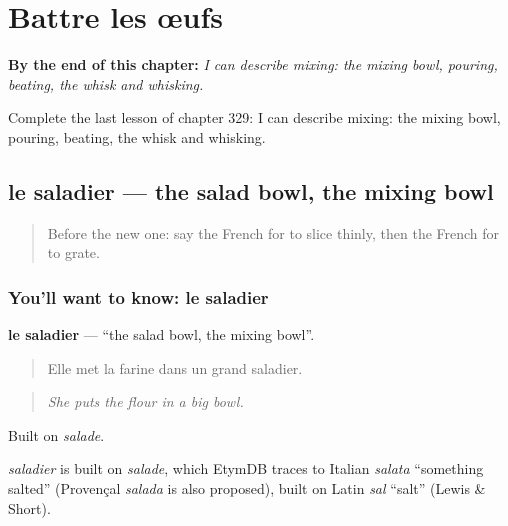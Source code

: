
\chapter{Battre les œufs}
\label{ch:fr-battre-les-ufs}

\begin{chapteropening}
\textbf{By the end of this chapter:} \emph{I can describe mixing: the mixing bowl, pouring, beating, the whisk and whisking.}

Complete the last lesson of chapter 329: I can describe mixing: the mixing bowl, pouring, beating, the whisk and whisking.
\end{chapteropening}

\section[le saladier]{le saladier — the salad bowl, the mixing bowl}

\label{lesson:FR-C329-saladier}



\begin{quote}
Before the new one: say the French for to slice thinly, then the French for to grate.
\end{quote}

\subsection*{You'll want to know: le saladier}
\textbf{le saladier} — \textquotedblleft{}the salad bowl, the mixing bowl\textquotedblright{}.

\begin{quote}
Elle met la farine dans un grand saladier.
\end{quote}

\begin{quote}
\emph{She puts the flour in a big bowl.}
\end{quote}

Built on \emph{salade}.

\begin{cousinweb}
\emph{saladier} is built on \emph{salade}, which EtymDB traces to Italian \emph{salata} \textquotedblleft{}something salted\textquotedblright{} (Provençal \emph{salada} is also proposed), built on Latin \emph{sal} \textquotedblleft{}salt\textquotedblright{} (Lewis \& Short).
\end{cousinweb}

